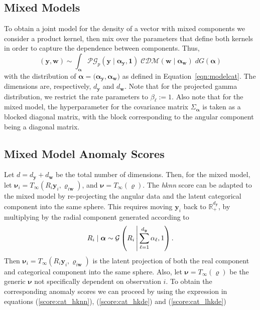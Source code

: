 \subsection{Mixed Models}
To obtain a joint model for the density of a vector with mixed components
    we consider a product kernel, then mix over the parameters that define 
    both kernels in order to capture the dependence between components. Thus,
    \begin{equation}
        \label{model:mixed}
        (\bm{y},\bm{w})\sim \int_{\bm{\alpha}}\mathcal{PG}_{p}
            (\bm{y}\mid\bm{\alpha}_{\bm{y}}, \bm{1})
        \;\mathcal{CDM}(\bm{w}\mid\bm{\alpha}_{\bm{w}})\;dG(\bm{\alpha})
    \end{equation}
  with the distribution of $\bm{\alpha}=(\bm{\alpha_\bm{y},\bm{\alpha_\bm{w}})}$ as
    defined in Equation~\ref{eqn:modelcat}. The dimensions are, respectively, 
    $d_{\bm{y}}$ and $d_{\bm{w}}$. Note that for 
    the projected gamma distribution, we restrict the rate parameters 
    to $\beta_{\ell} := 1$.  Also note that for the mixed model, the hyperparameter 
    for the covariance matrix $\Sigma_{\bm{\alpha}}$ is taken as a blocked diagonal 
    matrix, with the block corresponding to the angular component being a 
    diagonal matrix.

\subsection{Mixed Model Anomaly Scores\label{sec:mixedscores}}
Let $d = d_{\bm{y}} + d_{\bm{w}}$ be the total number of dimensions.  
    Then, for the mixed model, let 
    $\bm{\nu}_i = T_{\infty}(R_i\bm{y}_i, \bm{\varrho}_{i\bm{w}})$, and 
    $\bm{\nu} = T_{\infty}(\bm{\varrho})$.  The \emph{hknn} score can be adapted 
    to the mixed model by re-projecting the angular data and the latent 
    categorical component into the same sphere. This requires moving $\bm{y}_i$ 
    back to $\mathbb{R}_+^{d_{\bm{y}}}$, by multiplying by the radial component
    generated according to
    \begin{equation}
        \label{eqn:angularradial}
        R_i\mid\bm{\alpha} \sim \mathcal{G}
        \left(R_i\,\middle\vert\,\sum_{\ell = 1}^{d_{\bm{y}}}\alpha_{\ell}, 1\right).
    \end{equation}
    Then $\bm{\nu}_i = T_{\infty}(R_i\bm{y}_i, \bm{\varrho}_{i\bm{w}})$ is the 
    latent projection of both the real component and categorical component into 
    the same sphere. Also, let $\bm{\nu} = T_{\infty}(\bm{\varrho})$ be the 
    generic $\bm{\nu}$ not specifically dependent on observation $i$.  To obtain the 
    corresponding anomaly scores we can proceed by using the expression in equations
    (\ref{score:cat_hknn}), (\ref{score:cat_hkde}) and (\ref{score:cat_lhkde}) 

